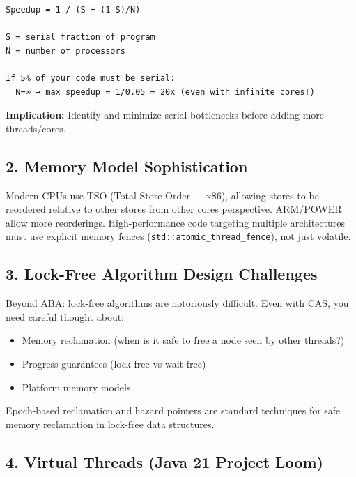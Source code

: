 \documentclass[11pt]{article}
\providecommand{\tightlist}{\setlength{\itemsep}{1pt}\setlength{\parskip}{0pt}}
\begin{document}

\setcodelang{}

\begin{verbatim}
Speedup = 1 / (S + (1-S)/N)

S = serial fraction of program
N = number of processors

If 5% of your code must be serial:
  N=∞ → max speedup = 1/0.05 = 20x (even with infinite cores!)
\end{verbatim}

\textbf{Implication:} Identify and minimize serial bottlenecks before adding more threads/cores.

\subsection{2. Memory Model Sophistication}\label{2-memory-model-sophistication}

Modern CPUs use TSO (Total Store Order --- x86), allowing stores to be reordered relative to other stores from other cores\textquotesingle{} perspective. ARM/POWER allow more reorderings. High-performance code targeting multiple architectures must use explicit memory fences (\texttt{std::atomic\_thread\_fence}), not just volatile.

\subsection{3. Lock-Free Algorithm Design Challenges}\label{3-lock-free-algorithm-design-challenges}

Beyond ABA: lock-free algorithms are notoriously difficult. Even with CAS, you need careful thought about:

\begin{itemize}
\tightlist
\item
  Memory reclamation (when is it safe to free a node seen by other threads?)
\item
  Progress guarantees (lock-free vs wait-free)
\item
  Platform memory models
\end{itemize}

Epoch-based reclamation and hazard pointers are standard techniques for safe memory reclamation in lock-free data structures.

\subsection{4. Virtual Threads (Java 21 Project Loom)}\label{4-virtual-threads-java-21-project-loom}
\end{document}
